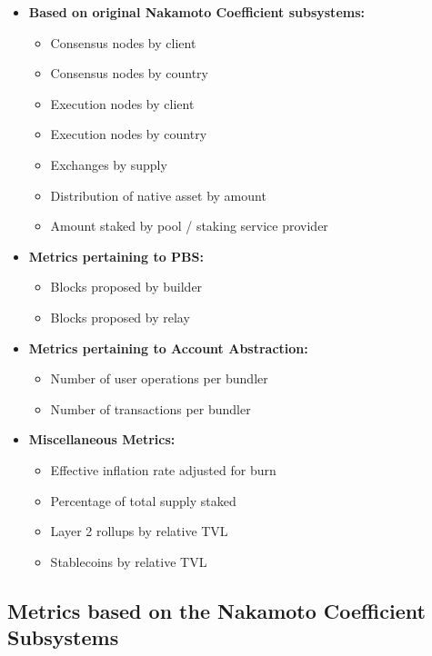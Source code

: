 \documentclass[conference]{IEEEtran}
\begin{document}
\begin{itemize}
   \item \textbf{Based on original Nakamoto Coefficient subsystems:}
   \begin{itemize}
     \item Consensus nodes by client
     \item Consensus nodes by country
     \item Execution nodes by client
     \item Execution nodes by country
     \item Exchanges by supply
     \item Distribution of native asset by amount
     \item Amount staked by pool / staking service provider
   \end{itemize}
   \item \textbf{Metrics pertaining to PBS:}
   \begin{itemize}
       \item Blocks proposed by builder
       \item Blocks proposed by relay
   \end{itemize}
   \item \textbf{Metrics pertaining to Account Abstraction:}
   \begin{itemize}
       \item Number of user operations per bundler
       \item Number of transactions per bundler
   \end{itemize}
   \item \textbf{Miscellaneous Metrics:}
   \begin{itemize}
       \item Effective inflation rate adjusted for burn
       \item Percentage of total supply staked
       \item Layer 2 rollups by relative TVL
       \item Stablecoins by relative TVL
   \end{itemize}
 \end{itemize}

 \vspace{4pt}

\subsection{Metrics based on the Nakamoto Coefficient Subsystems}
\end{document}
